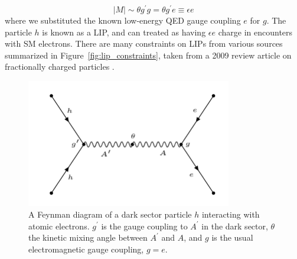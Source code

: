 \begin{equation}
|M| \sim  \theta g^{\prime} g = \theta g^{\prime} e \equiv \epsilon e
\end{equation}
where we substituted the known low-energy \ac{QED} gauge coupling $e$ for $g$. The particle $h$ is known as a \ac{LIP}, and can treated as having $\epsilon e$ charge in encounters with \ac{SM} electrons.
There are many constraints on \ac{LIP}s from various sources summarized in Figure~\ref{fig:lip_constraints}, taken from a 2009 review article on fractionally charged particles \cite{Perl2009}.

\begin{figure}[htbp]
\begin{center}
\includegraphics[width=0.8\textwidth]{figures/theory/diagram.png}
\caption{ A Feynman diagram of a dark sector particle $h$ interacting with atomic electrons. $g^{\prime}$ is the gauge coupling to $A^{\prime}$ in the dark sector, $\theta$ the kinetic mixing angle between $A^{\prime}$ and $A$, and $g$ is the usual electromagnetic gauge coupling, $g=e$.  }
\label{fig:diagram}
\end{center}
\end{figure}


